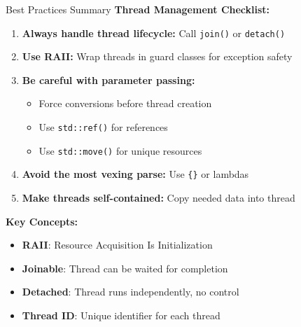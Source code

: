 \begin{frame}[fragile]{ Best Practices Summary}
	\textbf{Thread Management Checklist:}

	\begin{enumerate}
		\item \textbf{Always handle thread lifecycle:} Call \texttt{join()} or \texttt{detach()}
		\item \textbf{Use RAII:} Wrap threads in guard classes for exception safety
		\item \textbf{Be careful with parameter passing:}
		      \begin{itemize}
			      \item Force conversions before thread creation
			      \item Use \texttt{std::ref()} for references
			      \item Use \texttt{std::move()} for unique resources
		      \end{itemize}
		\item \textbf{Avoid the most vexing parse:} Use \texttt{\{\}} or lambdas
		\item \textbf{Make threads self-contained:} Copy needed data into thread
	\end{enumerate}

	\vspace{1em}
	\textbf{Key Concepts:}
	\begin{itemize}
		\item \textbf{RAII}: Resource Acquisition Is Initialization
		\item \textbf{Joinable}: Thread can be waited for completion
		\item \textbf{Detached}: Thread runs independently, no control
		\item \textbf{Thread ID}: Unique identifier for each thread
	\end{itemize}
\end{frame}
